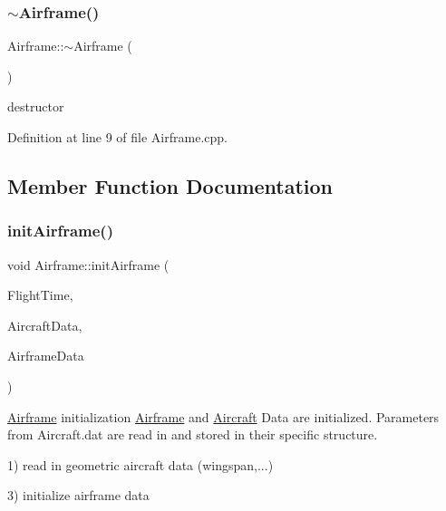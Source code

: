 \mbox{\label{class_airframe_af849116afbf7c4d7d2d5c189ff68cb7d}} 
\subsubsection{\texorpdfstring{$\sim$\+Airframe()}{~Airframe()}}
{\footnotesize\ttfamily Airframe\+::$\sim$\+Airframe (\begin{DoxyParamCaption}{ }\end{DoxyParamCaption})}



destructor 



Definition at line 9 of file Airframe.\+cpp.



\subsection{Member Function Documentation}
\mbox{\label{class_airframe_ad7e530da939683d17010262d0fee76ca}} 
\subsubsection{\texorpdfstring{init\+Airframe()}{initAirframe()}}
{\footnotesize\ttfamily void Airframe\+::init\+Airframe (\begin{DoxyParamCaption}\item[{\hyperlink{group___tools_ga3f1431cb9f76da10f59246d1d743dc2c}{Float64} \&}]{Flight\+Time,  }\item[{Aircraft\+Struct \&}]{Aircraft\+Data,  }\item[{Airframe\+Struct \&}]{Airframe\+Data }\end{DoxyParamCaption})}



\hyperlink{class_airframe}{Airframe} initialization \hyperlink{class_airframe}{Airframe} and \hyperlink{class_aircraft}{Aircraft} Data are initialized. Parameters from Aircraft.\+dat are read in and stored in their specific structure. 

1) read in geometric aircraft data (wingspan,...)

3) initialize airframe data 

